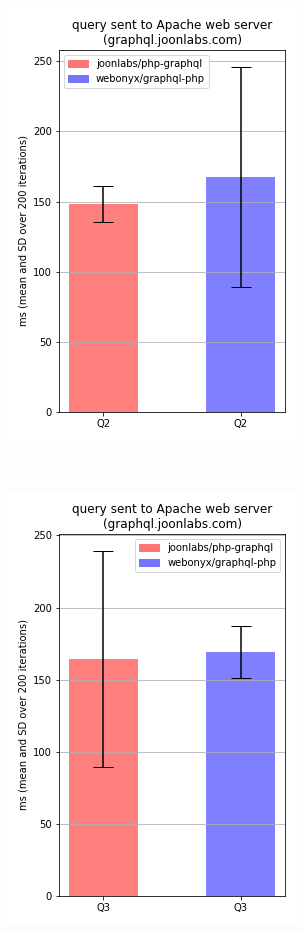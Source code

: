 \documentclass[11pt, a4paper]{article}
\begin{document}
\begin{figure}
\begin{subfigure}{.5\textwidth}
  \includegraphics[width=.75\linewidth]{results/joonlabs_Q2.png}
  \label{localhost_Q2}
\end{subfigure}%
\\
\begin{subfigure}{.5\textwidth}
  \centering
  \includegraphics[width=.75\linewidth]{results/joonlabs_Q3.png}

\end{subfigure}
\end{figure}
\end{document}
